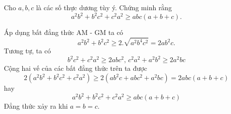 \begin{problem}
	Cho $a, b, c$ là các số thực dương tùy ý. Chứng minh rằng
	\[
		a^2b^2 + b^2c^2 + c^2a^2 \ge abc(a + b + c).
	\]

	\solution

	Áp dụng bất đẳng thức AM - GM ta có
	\[
		a^2b^2 + b^2c^2 \ge 2.\sqrt{a^2b^4c^2} = 2ab^2c.
	\]
	Tương tự, ta có 
	\[
		b^2c^2 + c^2a^2 \ge 2abc^2,\, c^2a^2 + a^2b^2 \ge 2a^2bc
	\]
	Cộng hai vế của các bất đẳng thức trên ta được 
	$$
		2(a^2b^2 + b^2c^2 + c^2a^2) \ge 2(ab^2c	+ abc^2 + a^2bc) = 2abc(a + b + c)
	$$ 
	hay 
	$$
		a^2b^2 + b^2c^2 + c^2a^2 \ge abc(a + b + c)
	$$
	Đẳng thức xảy ra khi $a = b = c$.
\end{problem}